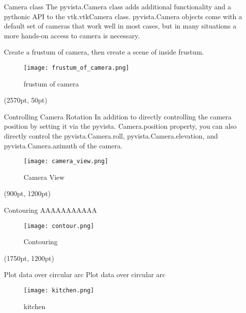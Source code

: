 \documentclass[final]{beamer}
\begin{document}
\begin{frame}[fragile]
\begin{textblock*}{800pt}
\begin{block}{Camera class}
The pyvista.Camera class adds additional functionality and a pythonic API to the vtk.vtkCamera class.
pyvista.Camera objects come with a default set of cameras that work well in most cases,
but in many situations a more hands-on access to camera is necessary.

Create a frustum of camera, then create a scene of inside frustum.

\begin{figure}
\texttt{[image: frustum\_of\_camera.png]}
\caption{frustum of camera}
\end{figure}
\end{block}
\end{textblock*}

\begin{textblock*}{800pt}(2570pt, 50pt)
\begin{block}{Controlling Camera Rotation}
In addition to directly controlling the camera position by setting it via the pyvista.
Camera.position property, you can also directly control the pyvista.Camera.roll, pyvista.Camera.elevation, and pyvista.Camera.azimuth of the camera.

\begin{figure}
\texttt{[image: camera\_view.png]}
\caption{Camera View}
\end{figure}
\end{block}
\end{textblock*}

\begin{textblock*}{800pt}(900pt, 1200pt)
\begin{block}{Contouring}
AAAAAAAAAAA

\begin{figure}
\texttt{[image: contour.png]}
\caption{Contouring}
\end{figure}
\end{block}
\end{textblock*}

\begin{textblock*}{800pt}(1750pt, 1200pt)
\begin{block}{Plot data over circular arc}
Plot data over circular arc
\begin{figure}
\texttt{[image: kitchen.png]}
\caption{kitchen}
\end{figure}
\end{block}
\end{textblock*}


\end{frame}
\end{document}
